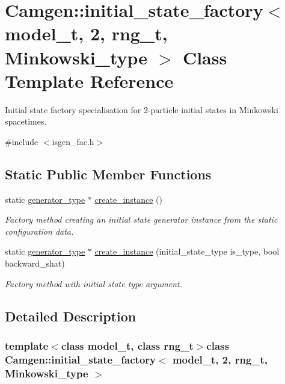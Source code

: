 \hypertarget{a00311}{}\section{Camgen\+:\+:initial\+\_\+state\+\_\+factory$<$ model\+\_\+t, 2, rng\+\_\+t, Minkowski\+\_\+type $>$ Class Template Reference}
\label{a00311}


Initial state factory specialisation for 2-\/particle initial states in Minkowski spacetimes.  




{\ttfamily \#include $<$isgen\+\_\+fac.\+h$>$}

\subsection*{Static Public Member Functions}
\begin{DoxyCompactItemize}
\item 
static \hyperlink{a00308}{generator\+\_\+type} $\ast$ \hyperlink{a00311_a80f3b6cec09ba839f84643a374580e0f}{create\+\_\+instance} ()
\begin{DoxyCompactList}\small\item\em Factory method creating an initial state generator instance from the static configuration data. \end{DoxyCompactList}\item 
\hypertarget{a00311_a7bdaf6fefe5d6111c89950d058128d53}{}static \hyperlink{a00308}{generator\+\_\+type} $\ast$ \hyperlink{a00311_a7bdaf6fefe5d6111c89950d058128d53}{create\+\_\+instance} (initial\+\_\+state\+\_\+type is\+\_\+type, bool backward\+\_\+shat)\label{a00311_a7bdaf6fefe5d6111c89950d058128d53}

\begin{DoxyCompactList}\small\item\em Factory method with initial state type argument. \end{DoxyCompactList}\end{DoxyCompactItemize}


\subsection{Detailed Description}
\subsubsection*{template$<$class model\+\_\+t, class rng\+\_\+t$>$class Camgen\+::initial\+\_\+state\+\_\+factory$<$ model\+\_\+t, 2, rng\+\_\+t, Minkowski\+\_\+type $>$}

